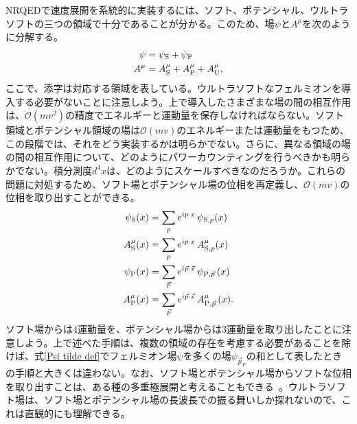 NRQEDで速度展開を系統的に実装するには、ソフト、ポテンシャル、ウルトラソフトの三つの領域で十分であることが分かる。このため、場$\psi$と$A^\mu$を次のように分解する。
%
\begin{subequations}\label{psi A decomposition}
\begin{align} 
	\psi &= \psi_{\rm S} + \psi_{\rm P} \\ 
	A^\mu &= A^\mu_{\rm S} + A^\mu_{\rm P} + A^\mu_{\rm U},
\end{align}
\end{subequations}
%
ここで、添字は対応する領域を表している。ウルトラソフトなフェルミオンを導入する必要がないことに注意しよう。上で導入したさまざまな場の間の相互作用は、$\mathcal{O} (mv^2)$の精度でエネルギーと運動量を保存しなければならない。ソフト領域とポテンシャル領域の場は$\mathcal{O}(mv)$のエネルギーまたは運動量をもつため、この段階では、それをどう実装するかは明らかでない。さらに、異なる領域の場の間の相互作用について、どのようにパワーカウンティングを行うべきかも明らかでない。積分測度$d^4x$は、どのようにスケールすべきなのだろうか。これらの問題に対処するため、ソフト場とポテンシャル場の位相を再定義し、$\mathcal{O}(mv)$の位相を取り出すことができる。
%
{\allowdisplaybreaks[0]\begin{subequations} \label{NRQED rephasing}
\begin{align}
	\psi_{\rm S} (x) &= \sum_p e^{i p \cdot x} \, \psi_{{\rm S}, p} (x) \\
	A_{\rm S}^\mu (x) &= \sum_p e^{i p \cdot x} \, A_{{\rm S}, p}^\mu (x) \\
	\psi_{\rm P} (x) &= \sum_{\vec p} e^{i \vec p \cdot \vec x} \, \psi_{{\rm P}, \vec p} \, (x) \\
	A_{\rm P}^\mu (x) &= \sum_{\vec p} e^{i \vec p \cdot \vec x} \, A_{{\rm P}, \vec p}^\mu \, (x) . 
\end{align}
\end{subequations}}
% 
ソフト場からは4運動量を、ポテンシャル場からは3運動量を取り出したことに注意しよう。上で述べた手順は、複数の領域の存在を考慮する必要があることを除けば、式\eqref{Psi tilde def}でフェルミオン場$\psi$を多くの場$\psi_{\vec p_F}$の和として表したときの手順と大きくは違わない。なお、ソフト場とポテンシャル場からソフトな位相を取り出すことは、ある種の多重極展開と考えることもできる~\cite{Labelle:1996en,Grinstein:1997gv}。ウルトラソフト場は、ソフト場とポテンシャル場の長波長での振る舞いしか探れないので、これは直観的にも理解できる。

